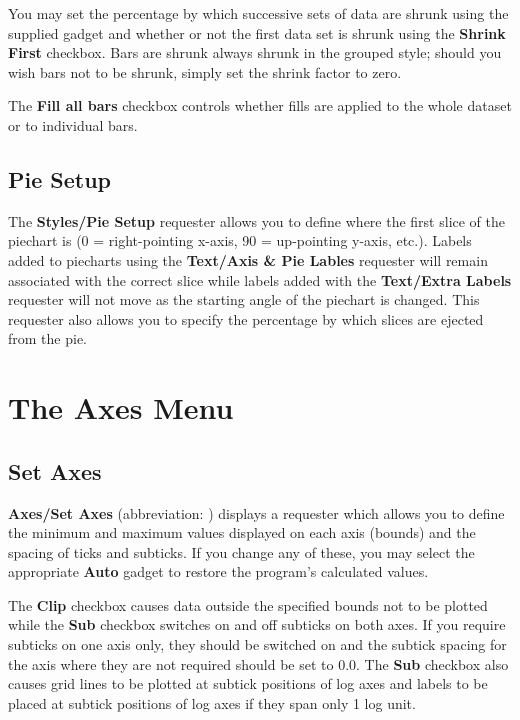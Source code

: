 You may set the percentage by which successive sets of data are shrunk
 using the supplied gadget
and whether or not the first data set is shrunk using the {\bf Shrink First} 
checkbox. Bars are shrunk always shrunk in the grouped style; should you wish bars 
not to be shrunk, simply set the shrink factor to zero. 

The {\bf Fill all bars} checkbox controls whether fills are applied to the whole 
dataset or to individual bars.


\subsection{Pie Setup}
The {\bf Styles/Pie Setup} requester allows you to define where 
the first slice 
of the piechart is (0 = right-pointing x-axis, 90 = up-pointing y-axis, etc.).
Labels added to piecharts using the {\bf Text/Axis \& Pie Lables} requester will 
remain associated with the correct slice while labels added with the {\bf Text/Extra 
Labels} requester will not move as the starting angle of the piechart is changed.
This requester also allows you to specify the percentage by which slices are 
ejected from the pie.



\section{The Axes Menu}
\subsection{Set Axes}
\label{ss:bounds}
{\bf Axes/Set Axes} (abbreviation: ) displays a requester which allows you to 
define the minimum and maximum 
values displayed on each axis (bounds) and the spacing of ticks 
 and subticks. 
If you change any of these, you may select the appropriate {\bf Auto} gadget to 
restore the program's calculated values.

The {\bf Clip} checkbox causes data outside the specified 
bounds not to be plotted 
while the {\bf Sub} checkbox switches on and off subticks on both axes. If you 
require subticks on one axis only, they should be switched on and the 
subtick spacing for the axis where they are not required should be set to 
0.0.
The {\bf Sub} checkbox also causes grid lines to be plotted at subtick positions of 
log axes and labels to be placed at subtick positions of log axes if they span only 
1 log unit.

